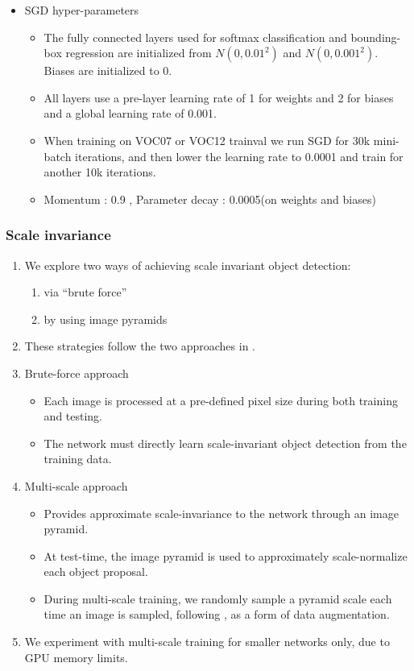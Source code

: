 \documentclass[11pt]{article}
\begin{document}
\begin{itemize}
\item SGD hyper-parameters\\
\label{sec-1-1-3-4}%
\begin{itemize}
\item The fully connected layers used for softmax classification and bounding-box regression
       are initialized from $N(0,0.01^2)$ and $N(0,0.001^2)$. Biases are initialized to 0.
\item All layers use a pre-layer learning rate of 1 for weights and 2 for biases and a global
       learning rate of 0.001.
\item When training on VOC07 or VOC12 trainval we run SGD for 30k mini-batch iterations, and
       then lower the learning rate to 0.0001 and train for another 10k iterations.
\item Momentum : 0.9 , Parameter decay : 0.0005(on weights and biases)
\end{itemize}

\end{itemize} %
\subsubsection{Scale invariance}
\label{sec-1-1-4}


\begin{enumerate}
\item We explore two ways of achieving scale invariant object detection:
\begin{enumerate}
\item via ``brute force''
\item by using image pyramids
\end{enumerate}
\item These strategies follow the two approaches in \footnotemark[4].
\item Brute-force approach
\begin{itemize}
\item Each image is processed at a pre-defined pixel size during both training and testing.
\item The network must directly learn scale-invariant object detection from the training data.
\end{itemize}
\item Multi-scale approach
\begin{itemize}
\item Provides approximate scale-invariance to the network through an image pyramid.
\item At test-time, the image pyramid is used to approximately scale-normalize each object 
         proposal.
\item During multi-scale training, we randomly sample a pyramid scale each time an image is
         sampled, following \footnotemark[4], as a form of data augmentation.
\end{itemize}
\item We experiment with multi-scale training for smaller networks only, due to GPU memory limits.
\end{enumerate}
          
\end{document}
